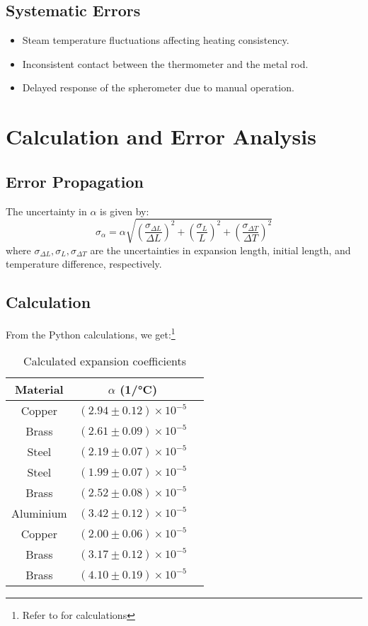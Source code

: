 \documentclass[%
 sor,
 jor,
 amsmath,amssymb,
 reprint,
]{revtex4-2}
\begin{document}
\subsection{Systematic Errors}
\begin{itemize}
    \item Steam temperature fluctuations affecting heating consistency.
    \item Inconsistent contact between the thermometer and the metal rod.
    \item Delayed response of the spherometer due to manual operation.
\end{itemize}

\section{Calculation and Error Analysis}
\subsection{Error Propagation}
The uncertainty in $\alpha$ is given by:
\[
\sigma_{\alpha} = \alpha \sqrt{\left( \frac{\sigma_{\Delta L}}{\Delta L} \right)^2 + \left( \frac{\sigma_L}{L} \right)^2 + \left( \frac{\sigma_{\Delta T}}{\Delta T} \right)^2}
\]
where $\sigma_{\Delta L}, \sigma_L, \sigma_{\Delta T}$ are the uncertainties in expansion length, initial length, and temperature difference, respectively.

\subsection{Calculation}
From the Python calculations, we get:\footnote{Refer to \cite{github} for calculations}

\begin{table}[h]
\centering
\begin{tabular}{ccc}
\hline
Material & $\alpha$ (\si{1/\degreeCelsius}) \\
\hline
Copper & $(2.94 \pm 0.12) \times 10^{-5}$ \\
Brass & $(2.61 \pm 0.09) \times 10^{-5}$ \\
Steel & $(2.19 \pm 0.07) \times 10^{-5}$ \\
Steel & $(1.99 \pm 0.07) \times 10^{-5}$ \\
Brass & $(2.52 \pm 0.08) \times 10^{-5}$ \\
Aluminium & $(3.42 \pm 0.12) \times 10^{-5}$ \\
Copper & $(2.00 \pm 0.06) \times 10^{-5}$ \\
Brass & $(3.17 \pm 0.12) \times 10^{-5}$ \\
Brass & $(4.10 \pm 0.19) \times 10^{-5}$ \\
\hline
\end{tabular}
\caption{Calculated expansion coefficients}
\end{table}
\end{document}
